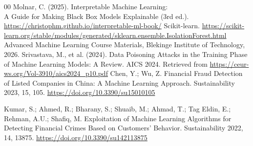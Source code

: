 \documentclass[conference]{IEEEtran}
\begin{document}
\begin{thebibliography}{00}
Molnar, C. (2025). Interpretable Machine Learning: \\ A Guide for Making Black Box Models Explainable (3rd ed.).\\
\url{https://christophm.github.io/interpretable-ml-book/}
Scikit-learn. \url{https://scikit-learn.org/stable/modules/generated/sklearn.ensemble.IsolationForest.html}
Advanced Machine Learning Course Materials, Blekinge Institute of Technology, 2026.
Srivastava, M., et al. (2024). Data Poisoning Attacks in the Training Phase of Machine Learning Models: A Review. 
AICS 2024. Retrieved from \url{https://ceur-ws.org/Vol-3910/aics2024_p10.pdf}
Chen, Y.; Wu, Z. Financial Fraud Detection of Listed Companies in China: A Machine Learning Approach. Sustainability 2023, 15, 105. \url{https://doi.org/10.3390/su15010105}

Kumar, S.; Ahmed, R.; Bharany, S.; Shuaib, M.; Ahmad, T.; Tag Eldin, E.; Rehman, A.U.; Shafiq, M. Exploitation of Machine Learning Algorithms for Detecting Financial Crimes Based on Customers’ Behavior. Sustainability 2022, 14, 13875. \url{https://doi.org/10.3390/su142113875}


\end{thebibliography}
\end{document}
